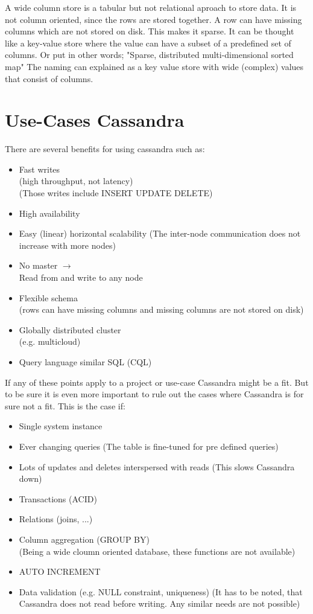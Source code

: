 A wide column store is a tabular but not relational aproach to store data.
It is not column oriented, since the rows are stored together. 
A row can have missing columns which are not stored on disk. This makes it sparse.
It can be thought like a key-value store where the value can have a subset of a predefined set of columns.
Or put in other words; "Sparse, distributed multi-dimensional sorted map" \cite{chang2008bigtable}
The naming can explained as a key value store with wide (complex) values that consist of columns.


\section{Use-Cases Cassandra}
There are several benefits for using cassandra such as:
\begin{itemize}
        \item Fast writes \\ (high throughput, not latency) \\
        (Those writes include {INSERT} {UPDATE} {DELETE})
        \item High availability
        \item Easy (linear) horizontal scalability
        (The inter-node communication does not increase with more nodes)
        \item No master $\rightarrow$ \\ Read from and write to any node
        \item Flexible schema \\ (rows can have missing columns and missing columns are not stored on disk)
        \item Globally distributed cluster \\ (e.g. multicloud)
        \item Query language similar SQL (CQL)
\end{itemize}
If any of these points apply to a project or use-case Cassandra might be a fit. 
But to be sure it is even more important to rule out the cases where Cassandra is for sure not a fit.
This is the case if:
\begin{itemize}
        \item Single system instance
        \item Ever changing queries (The table is fine-tuned for pre defined queries)
        \item Lots of updates and deletes interspersed with reads (This slows Cassandra down)
        \item Transactions (ACID)
        \item Relations (joins, ...)
        \item Column aggregation ({GROUP BY}) \\
        (Being a wide cloumn oriented database, these functions are not available)
        \item {AUTO INCREMENT}
        \item Data validation (e.g. {NULL} constraint, uniqueness) (It has to be noted, that Cassandra does not read before writing. Any similar needs are not possible)
\end{itemize}

